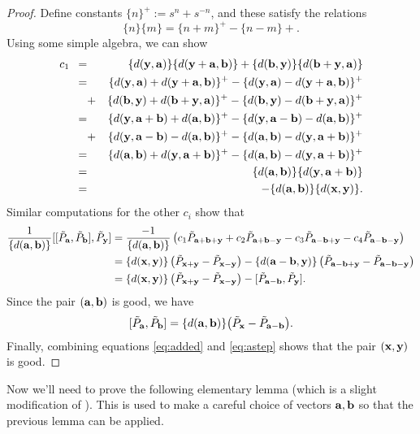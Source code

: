 \begin{proof}
Define constants $\{n\}^+ := s^n + s^{-n}$, and these satisfy the relations
\[
\{n\}\{m\} = \{n+m\}^+ - \{n-m\}+.
\]
Using some simple algebra, we can show
	\begin{eqnarray*}
c_1 \,\,\, =& &  \{d(\yy,\aab)\} \{d(\yy+\aab,\bb)\} + \{d(\bb,\yy)\} \{d(\bb+\yy,\aab)\} \\
=&& \{d(\yy,\aab)+d(\yy+\aab,\bb)\}^+ - \{d(\yy,\aab)-d(\yy+\aab,\bb)\}^+ \\
&+& \{d(\bb,\yy)+d(\bb+\yy,\aab)\}^+ - \{d(\bb,\yy)-d(\bb+\yy,\aab)\}^+  \\
=&& \{d(\yy,\aab+\bb)+d(\aab,\bb)\}^+ - \{d(\yy,\aab-\bb)-d(\aab,\bb)\}^+ \\
&+& \{d(\yy,\aab-\bb)-d(\aab,\bb)\}^+ - \{d(\aab,\bb)-d(\yy,\aab+\bb)\}^+ \\
=&& \{d(\aab,\bb)+d(\yy,\aab+\bb)\}^+ - \{d(\aab,\bb)-d(\yy,\aab+\bb)\}^+ \\
=&& \{d(\aab,\bb)\} \{d(\yy,\aab+\bb)\} \\
=&& - \{d(\aab,\bb)\} \{d(\xx,\yy)\}.
	\end{eqnarray*}
Similar computations for the other $c_i$ show that 
	\begin{align}
\frac{1}{\{d(\aab,\bb)\}}[[\tilde{P}_\aab,\tilde{P}_\bb],\tilde{P}_\yy] &=  \frac{-1}{\{d(\aab,\bb)\}} \left( c_1 \tilde{P}_{\aab+\bb+\yy} + c_2 \tilde{P}_{\aab+\bb-\yy} - c_3 \tilde{P}_{\aab-\bb+\yy} - c_4 \tilde{P}_{\aab-\bb-\yy}\right) \notag\\ 
&=  \{d(\xx,\yy)\} \left( \tilde{P}_{\xx+\yy} - \tilde{P}_{\xx-\yy} \right) 
-\{d(\aab-\bb,\yy)\} \left( \tilde{P}_{\aab-\bb+\yy} - \tilde{P}_{\aab-\bb-\yy} \right)\notag \\
&= \{d(\xx,\yy)\} \left( \tilde{P}_{\xx+\yy} - \tilde{P}_{\xx-\yy} \right) 
- [\tilde{P}_{\aab-\bb},\tilde{P}_\yy]. \label{eq:astep}
	\end{align}
	Since the pair $(\aab,\bb)$ is good, we have 
\begin{equation}\label{eq:added}
[\tilde{P}_{\aab}, \tilde{P}_{\bb}] = \{d(\aab, \bb )\} \big( \tilde{P}_{\xx} - \tilde{P}_{\aab-\bb} \big).
\end{equation}
Finally, combining equations \eqref{eq:added} and \eqref{eq:astep} shows that the pair $(\xx,\yy)$ is good.
\end{proof}

Now we'll need to prove the following elementary lemma (which is a slight modification of \cite[Lemma 1]{FG00} ). This is used to make a careful choice of vectors $\aab, \bb$ so that the previous lemma can be applied. 

